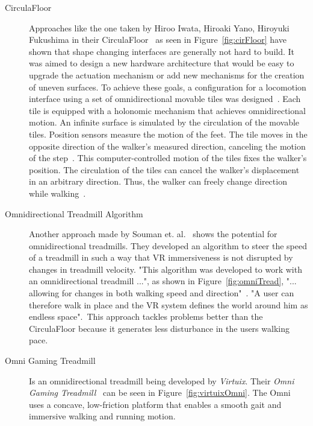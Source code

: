 \begin{description}
	\item[CirculaFloor] Approaches like the one taken by Hiroo Iwata, Hiroaki Yano, Hiroyuki Fukushima in their CirculaFloor~\cite{Iwata:2005:CLI:1078037.1079777} as seen in Figure~\ref{fig:cirFloor} have shown that shape changing interfaces are generally not hard to build. It was aimed to design a new hardware architecture that would be easy to upgrade the actuation mechanism or add new mechanisms for the creation of uneven surfaces. To achieve these goals, a configuration for a locomotion interface using a set of omnidirectional	movable tiles was designed~\cite{Iwata:2005:CLI:1078037.1079777}. \newline Each tile is equipped with a holonomic mechanism that achieves omnidirectional motion. An infinite surface is simulated by the circulation of the movable tiles. Position sensors measure the motion of the feet. The tile moves in the opposite direction of the walker’s measured direction, canceling the motion of the step~\cite{Iwata:2005:CLI:1078037.1079777}. This computer-controlled motion of the tiles fixes the walker’s position. The circulation of the tiles can cancel the walker’s displacement in an arbitrary direction. Thus, the walker can freely change direction while walking~\cite{Iwata:2005:CLI:1078037.1079777}. 
	
	\item[Omnidirectional Treadmill Algorithm]Another approach made by Souman et. al.~\cite{Souman:2010:MVW:1670671.1670675} shows the potential for omnidirectional treadmills. They developed an algorithm to steer the speed of a treadmill in such a way that VR immersiveness is not disrupted by changes in treadmill velocity. "This algorithm was developed to work with an omnidirectional treadmill ...", as shown in Figure~\ref{fig:omniTread}, "... allowing for changes in both walking speed and direction"~\cite{Souman:2010:MVW:1670671.1670675}. "A user can therefore walk in place and the VR system defines the world around him as endless space".~\cite{Souman:2010:MVW:1670671.1670675}\newline This approach tackles problems better than the CirculaFloor because it generates less disturbance in the users walking pace.
	
	\item[Omni Gaming Treadmill] Is an omnidirectional treadmill being developed by \textit{Virtuix}. Their \textit{Omni Gaming Treadmill~\textcopyright} can be seen in Figure~\ref{fig:virtuixOmni}. The Omni uses a concave, low-friction platform that enables a smooth gait and immersive walking and running motion.~\cite{online:omni}
\end{description}

